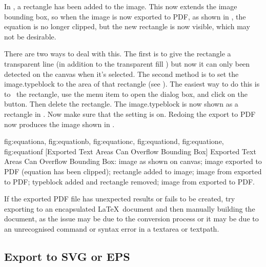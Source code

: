 In , a rectangle has been
added to the image. This now extends the image bounding box, so when
the image is now exported to PDF, as shown in
, the equation is no longer clipped,
but the new rectangle is now visible, which may not be desirable.

There are two ways to deal with this. The first is to give the
rectangle a transparent line  (in addition to the
transparent fill ) but now it can only been detected on the
\gls{canvas} when it's selected. The second method is to set the
\gls{image.typeblock} to the area of that rectangle (see ).
The easiest way to do this is to \select\ the rectangle, use the
 menu item to open the
 dialog box, and click on the
 button. Then delete the
rectangle. The \gls{image.typeblock} is now shown as a  rectangle in
. Now make sure that the
setting is on. Redoing the export to PDF now
produces the image shown in .

{
 {fig:equationa}{}{},
 {fig:equationb}{}{},
 {fig:equationc}{}{},
 {fig:equationd}{}{},
 {fig:equatione}{}{},
 {fig:equationf}{}{}
}
[Exported Text Areas Can Overflow Bounding Box]
{Exported Text Areas Can Overflow Bounding Box:
 image as shown on canvas;
 image exported to PDF (equation has been clipped);
 rectangle added to image;
 image from  exported to PDF;
 typeblock added and rectangle removed;
 image from  exported to PDF.}

If the exported PDF file has unexpected results or fails to be
created, try exporting to an encapsulated \LaTeX\ document and then
manually building the document, as the issue may be due to the
conversion process or it may be due to an unrecognised command or
syntax error in a \gls{textarea} or \gls{textpath}.


\subsection{Export to SVG or EPS}\label{sec:exportsvgeps}

